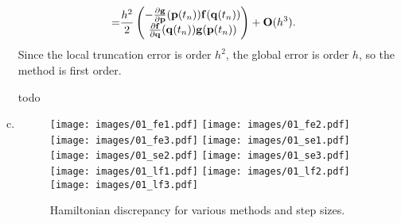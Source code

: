 \begin{solution}
\begin{enumerate}[(a)]
\begin{align*}
      = & \frac{h^2}{2}
      \begin{pmatrix}
        -\frac{\partial \mathbf{g}}{\partial \mathbf{p}}(\mathbf{p}(t_n)) \mathbf{f}(\mathbf{q}(t_n)) \\
        \frac{\partial \mathbf{f}}{\partial \mathbf{q}}(\mathbf{q}(t_n))\mathbf{g}(\mathbf{p}(t_n))
      \end{pmatrix}
      + \mathbf{O}(h^3).
    \end{align*}
    Since the local truncation error is order $h^2$, the global error is order $h$, so the method is first order.
    \item [todo]
    \item 
    \begin{figure}
      \centering
      \texttt{[image: images/01\_fe1.pdf]}
      \texttt{[image: images/01\_fe2.pdf]}
      \texttt{[image: images/01\_fe3.pdf]}
      \texttt{[image: images/01\_se1.pdf]}
      \texttt{[image: images/01\_se2.pdf]}
      \texttt{[image: images/01\_se3.pdf]}
      \texttt{[image: images/01\_lf1.pdf]}
      \texttt{[image: images/01\_lf2.pdf]}
      \texttt{[image: images/01\_lf3.pdf]}
      \caption{Hamiltonian discrepancy for various methods and step sizes.}
      \label{F:hamiltonian}
    \end{figure}
  \end{enumerate}
\end{solution}
